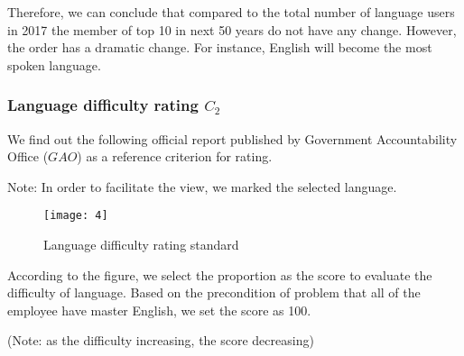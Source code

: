 \documentclass{mcmthesis}
\begin{document}
Therefore, we can conclude that compared to the total number of language users in 2017 the member of top 10 in next 50 years do not have any change. However, the order has a dramatic change. For instance, English will become the most spoken language.

\subsubsection{Language difficulty rating $C_2$}
We find out the following official report published by Government Accountability Office ($GAO$) as a reference criterion for rating.

Note: In order to facilitate the view, we marked the selected language.
\begin{figure}[!ht]
  \centering
  \texttt{[image: 4]}
  \caption{Language difficulty rating standard \cite{12}}
  \label{Language difficulty rating standard}
\end{figure}

According to the figure, we select the proportion as the score to evaluate the difficulty of language. Based on the precondition of problem that all of the employee have master English, we set the score as 100.

(Note: as the difficulty increasing, the score decreasing)
\begin{table}[!ht]
  \caption{Language difficulty rating scale}
  \label{Language difficulty rating scale}
\end{table}
\end{document}
